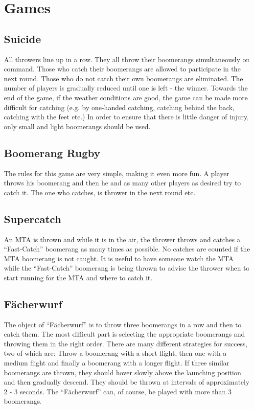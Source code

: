 \chapter{Games}
\newpage

\section{Suicide}
All throwers line up in a row. They all throw their boomerangs simultaneously on command. Those who catch their boomerangs are allowed to participate in the next round. Those who do not catch their own boomerangs are eliminated. The number of players is gradually reduced until one is left - the winner. Towards the end of the game, if the weather conditions are good, the game can be made more difficult for catching (e.g. by one-handed catching, catching behind the back, catching with the feet etc.) In order to ensure that there is little danger of injury, only small and light boomerangs should be used.

\section{Boomerang Rugby}
The rules for this game are very simple, making it even more fun. A player throws his boomerang and then he and as many other players as desired try to catch it. The one who catches, is thrower in the next round etc.

\section{Supercatch}
An MTA is thrown and while it is in the air, the thrower throws and catches a ``Fast-Catch'' boomerang as many times as possible. No catches are counted if the MTA boomerang is not caught. It is useful to have someone watch the MTA while the ``Fast-Catch'' boomerang is being thrown to advise the thrower when to start running for the MTA and where to catch it.
\newpage

\section{Fächerwurf}
The object of ``Fächerwurf'' is to throw three boomerangs in a row and then to catch them. The most difficult part is selecting the appropriate boomerangs and throwing them in the right order. There are many different strategies for success, two of which are:
Throw a boomerang with a short flight, then one with a medium flight and finally a boomerang with a longer flight.
If three similar boomerangs are thrown, they should hover slowly above the launching position and then gradually descend. They should be thrown at intervals of approximately 2 - 3 seconds.
The ``Fächerwurf'' can, of course, be played with more than 3 boomerangs.

